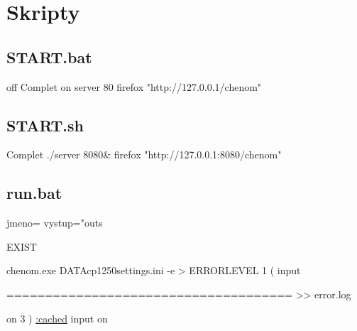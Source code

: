 \chapter{\label{priloha:skripty}Skripty}

\section{START.bat}
\begin{kodblok}
 off
 Complet \bs
{} on
 server 80
 firefox "http://127.0.0.1/chenom"
\end{kodblok}

\section{START.sh}
\begin{kodblok}
 Complet
./server 8080&
firefox "http://127.0.0.1:8080/chenom"
\end{kodblok}

\section{run.bat}
\begin{kodblok}
 jmeno=%
 vystup="outs{\bs}%

 EXIST %


chenom.exe DATA{\bs}cp1250{\bs}settings.ini -e >%
 ERRORLEVEL 1 (
     input

     ===================================== >> error.log

     on
     3
)
\underline{:cached}
     input
 on
\end{kodblok}

